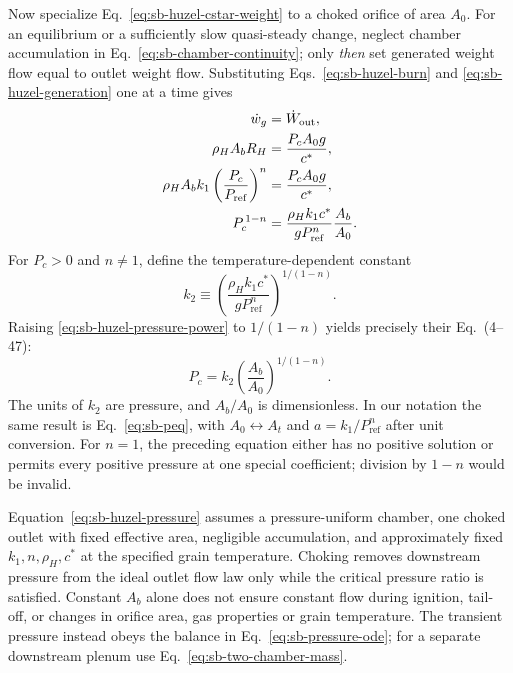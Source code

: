 Now specialize Eq.~\eqref{eq:sb-huzel-cstar-weight} to a choked orifice
of area $A_0$. For an equilibrium or a sufficiently slow quasi-steady
change, neglect chamber accumulation in
Eq.~\eqref{eq:sb-chamber-continuity}; only \emph{then} set generated
weight flow equal to outlet weight flow. Substituting
Eqs.~\eqref{eq:sb-huzel-burn} and \eqref{eq:sb-huzel-generation}
one at a time gives
\begin{align}
 \dot w_g&=\dot W_{\mathrm{out}},\notag\\
 \rho_HA_bR_H&=\frac{P_cA_0g}{c^*},\notag\\
 \rho_HA_bk_1\left(\frac{P_c}{P_{\mathrm{ref}}}\right)^n
   &=\frac{P_cA_0g}{c^*},\notag\\
 P_c^{\,1-n}
   &=\frac{\rho_Hk_1c^*}{gP_{\mathrm{ref}}^n}
     \frac{A_b}{A_0}.
 \label{eq:sb-huzel-pressure-power}
\end{align}
For $P_c>0$ and $n\ne1$, define the temperature-dependent constant
\begin{equation}\label{eq:sb-huzel-k2}
 k_2\equiv
 \left(\frac{\rho_Hk_1c^*}{gP_{\mathrm{ref}}^n}\right)^{1/(1-n)}.
\end{equation}
Raising \eqref{eq:sb-huzel-pressure-power} to $1/(1-n)$ yields precisely
their Eq.~(4--47):
\begin{equation}\label{eq:sb-huzel-pressure}
 \boxed{P_c=k_2\left(\frac{A_b}{A_0}\right)^{1/(1-n)}.}
\end{equation}
The units of $k_2$ are pressure, and $A_b/A_0$ is dimensionless.
In our notation the same result is Eq.~\eqref{eq:sb-peq}, with
$A_0\leftrightarrow A_t$ and $a=k_1/P_{\mathrm{ref}}^n$ after unit
conversion. For $n=1$, the preceding equation either has no positive
solution or permits every positive pressure at one special coefficient;
division by $1-n$ would be invalid.

Equation~\eqref{eq:sb-huzel-pressure} assumes a pressure-uniform chamber,
one choked outlet with fixed effective area, negligible accumulation,
and approximately fixed $k_1,n,\rho_H,c^*$ at the specified grain
temperature. Choking removes downstream pressure from the ideal outlet
flow law only while the critical pressure ratio is satisfied.
Constant $A_b$ alone does not ensure constant flow during ignition,
tail-off, or changes in orifice area, gas properties or grain
temperature. The transient pressure instead obeys the balance in
Eq.~\eqref{eq:sb-pressure-ode}; for a separate downstream plenum use
Eq.~\eqref{eq:sb-two-chamber-mass}.

